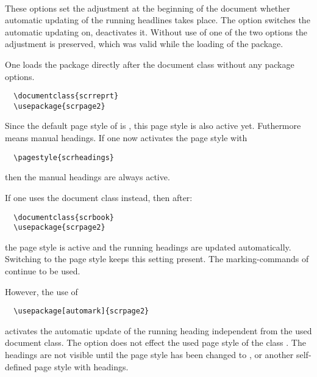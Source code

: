 \label{page:scrpage.automark}%
\begin{Declaration}
\\
\end{Declaration}%
These options set the adjustment at the beginning of the document
whether automatic updating of the running headlines takes place.
The option  switches the automatic updating on,
 deactivates it.
Without use of one of the two options the adjustment is preserved,
which was valid while the loading of the package.
%
\begin{Example}
  One loads the package  directly after the document class
   without any package options.
\begin{lstlisting}
  \documentclass{scrreprt}
  \usepackage{scrpage2}
\end{lstlisting}
  Since the default page style of  is ,
  this page style is also active yet.
  Futhermore  means manual headings.
  If one now activates the page style  with
\begin{lstlisting}
  \pagestyle{scrheadings}
\end{lstlisting}
  then the manual headings are always active. 

  If one uses the document class  instead, then after:
\begin{lstlisting}
  \documentclass{scrbook}
  \usepackage{scrpage2}
\end{lstlisting}
  the page style  is active and the running headings
  are updated automatically.
  Switching to the page style  keeps this
  setting present.
  The marking-commands of  continue to be used.

  However, the use of
\begin{lstlisting}
  \usepackage[automark]{scrpage2}
\end{lstlisting}
  activates the automatic update of the running heading independent
  from the used document class.
  The option does not effect the used page style  of
  the class .
  The headings are not visible until the page style has been changed to
  ,
   or another self-defined page style with headings.%
\end{Example}%
%

